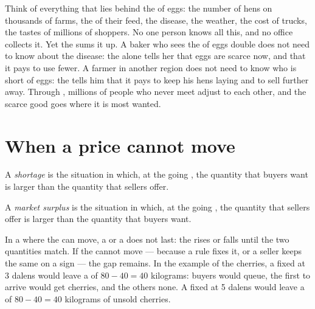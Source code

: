 Think of everything that lies behind the  of eggs: the number of hens on thousands of
farms, the  of their feed, the disease, the weather, the cost of trucks, the tastes of
millions of shoppers. No one person knows all this, and no office collects it. Yet the 
sums it up. A baker who sees the  of eggs double does not need to know about the
disease: the  alone tells her that eggs are scarce now, and that it pays to use fewer.
A farmer in another region does not need to know who is short of eggs: the  tells him
that it pays to keep his hens laying and to sell further away. Through , millions of
people who never meet adjust to each other, and the scarce good goes where it is most wanted.

\section{When a price cannot move}

\begin{definition}[Shortage]\label{def:g7:markets-and-prices:shortage}
A \emph{shortage} is the situation in which, at the going , the
quantity that buyers want is larger than the quantity that sellers offer.
\end{definition}

\begin{definition}\label{def:g7:markets-and-prices:market-surplus}
A \emph{market surplus} is the situation in which, at the going ,
the quantity that sellers offer is larger than the quantity that buyers want.
\end{definition}

In a  where the  can move, a  or a  does not last: the
 rises or falls until the two quantities match. If the  cannot move --- because a
rule fixes it, or a seller keeps the same  on a sign --- the gap remains. In the example
of the cherries, a  fixed at 3 dalens would leave a  of $80 - 40 = 40$
kilograms: buyers would queue, the first to arrive would get cherries, and the others none.
A  fixed at 5 dalens would leave a  of $80 - 40 = 40$ kilograms of unsold
cherries.

